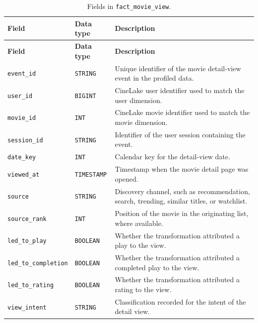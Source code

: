 \documentclass[a4paper,12pt]{article}
\newcommand{\dbsep}{\_\allowbreak}
\begin{document}
\begingroup
\small
\setlength{\tabcolsep}{4pt}
\renewcommand{\arraystretch}{1.1}
\begin{longtable}{@{}>{\raggedright\arraybackslash}p{}
                    >{\raggedright\arraybackslash}p{}
                    >{\raggedright\arraybackslash}p{}@{}}
\caption{Fields in \texttt{fact\dbsep movie\dbsep view}.}\\
\toprule
\textbf{Field} & \textbf{Data type} & \textbf{Description}\\
\midrule
\endfirsthead
\toprule
\textbf{Field} & \textbf{Data type} & \textbf{Description}\\
\midrule
\endhead
\bottomrule
\endfoot
\texttt{event\dbsep id} & \texttt{STRING} & Unique identifier of the movie detail-view event in the profiled data.\\
\texttt{user\dbsep id} & \texttt{BIGINT} & CineLake user identifier used to match the user dimension.\\
\texttt{movie\dbsep id} & \texttt{INT} & CineLake movie identifier used to match the movie dimension.\\
\texttt{session\dbsep id} & \texttt{STRING} & Identifier of the user session containing the event.\\
\texttt{date\dbsep key} & \texttt{INT} & Calendar key for the detail-view date.\\
\texttt{viewed\dbsep at} & \texttt{TIMESTAMP} & Timestamp when the movie detail page was opened.\\
\texttt{source} & \texttt{STRING} & Discovery channel, such as recommendation, search, trending, similar titles, or watchlist.\\
\texttt{source\dbsep rank} & \texttt{INT} & Position of the movie in the originating list, where available.\\
\texttt{led\dbsep to\dbsep play} & \texttt{BOOLEAN} & Whether the transformation attributed a play to the view.\\
\texttt{led\dbsep to\dbsep completion} & \texttt{BOOLEAN} & Whether the transformation attributed a completed play to the view.\\
\texttt{led\dbsep to\dbsep rating} & \texttt{BOOLEAN} & Whether the transformation attributed a rating to the view.\\
\texttt{view\dbsep intent} & \texttt{STRING} & Classification recorded for the intent of the detail view.\\
\end{longtable}
\endgroup
\end{document}
